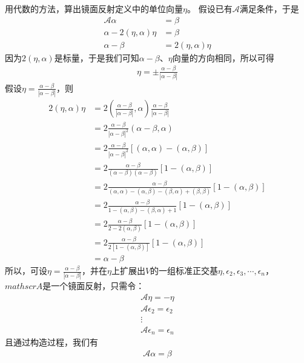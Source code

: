\documentclass{article}
\begin{document}
用代数的方法，算出镜面反射定义中的单位向量$\eta$。
假设已有$\mathscr{A}$满足条件，于是
\begin{align*}
  \mathscr{A} \alpha            & = \beta                \\
  \alpha - 2(\eta, \alpha) \eta & = \beta                \\
  \alpha - \beta                & = 2(\eta, \alpha) \eta
\end{align*}
因为$2(\eta, \alpha)$是标量，于是我们可知$\alpha - \beta$、$\eta$向量的方向相同，所以可得
\begin{align*}
  \eta = \pm \frac{\alpha - \beta}{|\alpha - \beta|}
\end{align*}
假设$\eta = \frac{\alpha - \beta}{|\alpha - \beta|}$，则
\begin{align*}
  2(\eta, \alpha) \eta
   & = 2(\frac{\alpha - \beta}{|\alpha - \beta|}, \alpha) \frac{\alpha - \beta}{|\alpha - \beta|}                          \\
   & = 2 \frac{\alpha - \beta}{|\alpha - \beta|^2}(\alpha - \beta, \alpha)                                                 \\
   & = 2 \frac{\alpha - \beta}{|\alpha - \beta|^2}[(\alpha, \alpha) - (\alpha, \beta)]                                     \\
   & = 2 \frac{\alpha - \beta}{(\alpha - \beta)(\alpha - \beta)}[1 - (\alpha, \beta)]                                      \\
   & = 2 \frac{\alpha - \beta}{(\alpha, \alpha) - (\alpha, \beta) - (\beta, \alpha) + (\beta, \beta)}[1 - (\alpha, \beta)] \\
   & = 2 \frac{\alpha - \beta}{1 - (\alpha, \beta) - (\beta, \alpha) + 1}[1 - (\alpha, \beta)]                             \\
   & = 2 \frac{\alpha - \beta}{2 - 2(\alpha, \beta)}[1 - (\alpha, \beta)]                                                  \\
   & = 2 \frac{\alpha - \beta}{2[1 - (\alpha, \beta)]}[1 - (\alpha, \beta)]                                                \\
   & = \alpha - \beta
\end{align*}
所以，可设$\eta = \frac{\alpha - \beta}{|\alpha - \beta|}$，并在$\eta$上扩展出$V$的一组标准正交基$\eta, \epsilon_2, \epsilon_3, \cdots, \epsilon_n$，
$mathscr{A}$是一个镜面反射，只需令：
\begin{align*}
  \mathscr{A} \eta = - \eta           \\
  \mathscr{A} \epsilon_2 = \epsilon_2 \\
  \vdots                              \\
  \mathscr{A} \epsilon_n = \epsilon_n
\end{align*}
且通过构造过程，我们有
\begin{align*}
  \mathscr{A} \alpha = \beta
\end{align*}
\end{document}
